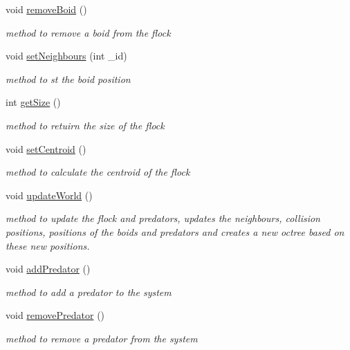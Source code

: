 \begin{DoxyCompactItemize}
void \hyperlink{classWorld_a7269569ed79ac31185a04d817c6cb597}{removeBoid} ()
\begin{DoxyCompactList}\small\item\em method to remove a boid from the flock \item\end{DoxyCompactList}\item 
void \hyperlink{classWorld_ab122dcc42d0f92282674ba5decb749bc}{setNeighbours} (int \_\-id)
\begin{DoxyCompactList}\small\item\em method to st the boid position \item\end{DoxyCompactList}\item 
int \hyperlink{classWorld_a1951be71ff041b9857bce6c4fe47a31c}{getSize} ()
\begin{DoxyCompactList}\small\item\em method to retuirn the size of the flock \item\end{DoxyCompactList}\item 
void \hyperlink{classWorld_ab65a3578f670b25f7805c87f0d5cf4df}{setCentroid} ()
\begin{DoxyCompactList}\small\item\em method to calculate the centroid of the flock \item\end{DoxyCompactList}\item 
void \hyperlink{classWorld_aea055bac16c4cb8886e70f670f46f044}{updateWorld} ()
\begin{DoxyCompactList}\small\item\em method to update the flock and predators, updates the neighbours, collision positions, positions of the boids and predators and creates a new octree based on these new positions. \item\end{DoxyCompactList}\item 
void \hyperlink{classWorld_a8b784b631e2e635837ab9d8877881771}{addPredator} ()
\begin{DoxyCompactList}\small\item\em method to add a predator to the system \item\end{DoxyCompactList}\item 
void \hyperlink{classWorld_a391e6a075dc5c22201a1a9d73d270af2}{removePredator} ()
\begin{DoxyCompactList}\small\item\em method to remove a predator from the system \item\end{DoxyCompactList}\item 

\end{DoxyCompactItemize}
